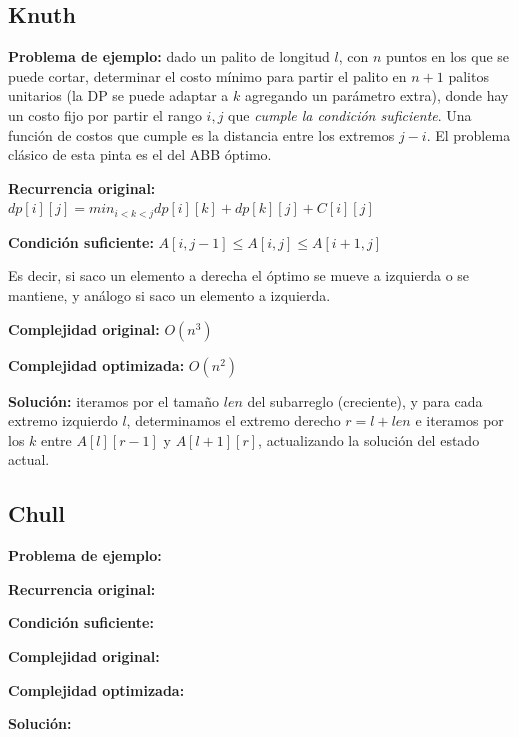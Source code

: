 \subsection{Knuth}
{
    \textbf{Problema de ejemplo:} dado un palito de longitud $l$, con $n$ puntos en los que se puede cortar,
    determinar el costo mínimo para partir el palito en $n+1$ palitos unitarios (la DP se puede adaptar a $k$ 
    agregando un parámetro extra), donde hay un costo fijo por partir el rango $i, j$ que \emph{cumple la 
    condición suficiente}. Una función de costos que cumple es la distancia entre los extremos $j-i$. 
    El problema clásico de esta pinta es el del ABB óptimo.

    \textbf{Recurrencia original:} $dp[i][j] = min_{i < k < j} {dp[i][k] + dp[k][j]} + C[i][j]$

    \textbf{Condición suficiente:} $A[i, j - 1] \leq  A[i, j] \leq A[i + 1, j]$

    Es decir, si saco un elemento a derecha el óptimo se mueve a izquierda o se mantiene, y 
    análogo si saco un elemento a izquierda.

    \textbf{Complejidad original:} $O(n^3)$

    \textbf{Complejidad optimizada:} $O(n^2)$

    \textbf{Solución:} iteramos por el tamaño $len$ del subarreglo (creciente), y para cada extremo izquierdo $l$,
    determinamos el extremo derecho $r=l+len$ e iteramos por los $k$ entre $A[l][r-1]$ y $A[l+1][r]$, actualizando la
    solución del estado actual.
}
\subsection{Chull}
{
    \textbf{Problema de ejemplo:} 

    \textbf{Recurrencia original:}

    \textbf{Condición suficiente:} 

    \textbf{Complejidad original:} 

    \textbf{Complejidad optimizada:} 

    \textbf{Solución:} 
}
